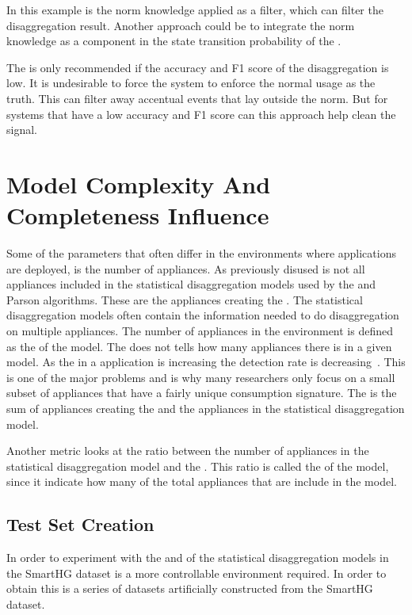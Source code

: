 In this example is the norm knowledge applied as a filter, which can filter the disaggregation result. Another approach could be to integrate the norm knowledge as a component in the state transition probability of the .

The  is only recommended if the accuracy and F1 score of the disaggregation is low. It is undesirable to force the system to enforce the normal usage as the truth. This can filter away accentual events that lay outside the norm. But for systems that have a low accuracy and F1 score can this approach help clean the signal. 

\section{Model Complexity And Completeness Influence}
\label{sec:MCACI}
Some of the parameters that often differ in the environments where  applications are deployed, is the number of appliances. As previously disused is not all appliances included in the statistical disaggregation models used by the  and Parson algorithms. These are the appliances creating the . The statistical disaggregation models often contain the information needed to do disaggregation on multiple appliances. The number of appliances in the environment is defined as the  of the model. The  does not tells how many appliances there is in a given model. As the  in a  application is increasing the detection rate is decreasing~\citep{RefWorks:34}. This is one of the major problems and is why many researchers only focus on a small subset of appliances that have a fairly unique consumption signature. The  is the sum of appliances creating the  and the appliances in the statistical disaggregation model. 

Another metric looks at the ratio between the number of appliances in the statistical disaggregation model and the . This ratio is called the  of the model, since it indicate how many of the total appliances that are include in the model.


\subsection{Test Set Creation}
\label{sec:datasetCreation}
In order to experiment with the  and  of the statistical disaggregation models in the SmartHG dataset is a more controllable environment required. In order to obtain this is a series of datasets artificially constructed from the SmartHG dataset. 

